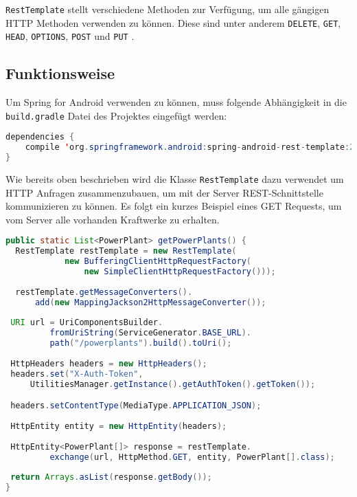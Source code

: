 \texttt{RestTemplate} stellt verschiedene Methoden zur Verfügung, um alle gängigen HTTP Methoden verwenden zu können. Diese sind unter anderem \texttt{DELETE}, \texttt{GET}, \texttt{HEAD}, \texttt{OPTIONS}, \texttt{POST} und \texttt{PUT} \cite{springDokuRestTemplate}.

\subsection{Funktionsweise}
Um Spring for Android verwenden zu können, muss folgende Abhängigkeit in die \texttt{build.gradle} Datei des Projektes eingefügt werden:

\begin{lstlisting}[language=java, numbers=none, frame=single, stringstyle=\color{mymauve}\scriptsize]
dependencies {
	compile 'org.springframework.android:spring-android-rest-template:2.0.0.M1'
}
\end{lstlisting}

Wie bereits oben beschrieben wird die Klasse \texttt{RestTemplate} dazu verwendet um HTTP Anfragen zusammenzubauen, um mit der Server REST-Schnittstelle kommunizieren zu können. Es folgt ein kurzes Beispiel eines GET Requests, um vom Server alle vorhanden Kraftwerke zu erhalten.

\begin{lstlisting}[language=java, caption={GET Request um alle Kraftwerke zu erhalten},label=lst:getAllPowerPlants, frame=single, tabsize=3]
public static List<PowerPlant> getPowerPlants() {
  RestTemplate restTemplate = new RestTemplate(
			new BufferingClientHttpRequestFactory(
				new SimpleClientHttpRequestFactory()));
				  
  restTemplate.getMessageConverters().
	  add(new MappingJackson2HttpMessageConverter());
 
 URI url = UriComponentsBuilder.
		 fromUriString(ServiceGenerator.BASE_URL).
		 path("/powerplants").build().toUri();
 
 HttpHeaders headers = new HttpHeaders();
 headers.set("X-Auth-Token", 
	 UtilitiesManager.getInstance().getAuthToken().getToken());

 headers.setContentType(MediaType.APPLICATION_JSON);
 
 HttpEntity entity = new HttpEntity(headers);
 
 HttpEntity<PowerPlant[]> response = restTemplate.
		 exchange(url, HttpMethod.GET, entity, PowerPlant[].class);
 
 return Arrays.asList(response.getBody());
}
\end{lstlisting}

